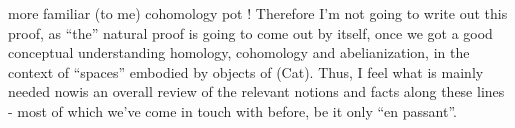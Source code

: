 more familiar (to me) cohomology pot ! Therefore I'm not going to write
out this proof, as ``the'' natural proof is going to come out by itself,
once we got a good conceptual understanding  homology, cohomology
and abelianization, in the context of  ``spaces''
embodied by objects of (Cat). Thus, I feel what is mainly needed now\hand{/}is
an overall review of the relevant notions and facts along these lines -
most of which we've come in touch with before, be it only ``en passant''.


